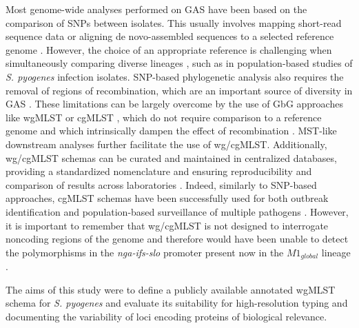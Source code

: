 Most genome-wide analyses performed on \ac{GAS} have been based on the comparison of \ac{SNPs} between isolates. This usually involves mapping short-read sequence data or aligning de novo-assembled sequences to a selected reference genome \cite{turner_emergence_2015, zhu_molecular_2015, zhu_trading_2015, lynskey_emergence_2019, nasser_evolutionary_2014, beres_molecular_2010, turner_community_2017, coelho_genomic_2019, davies_atlas_2019}. However, the choice of an appropriate reference is challenging when simultaneously comparing diverse lineages \cite{maiden_mlst_2013, neumann_core_2019}, such as in population-based studies of \textit{S. pyogenes} infection isolates. \ac{SNP}-based phylogenetic analysis also requires the removal of regions of recombination, which are an important source of diversity in \ac{GAS} \cite{davies_atlas_2019, maiden_mlst_2013, neumann_core_2019, mcgregor_multilocus_2004}. These limitations can be largely overcome by the use of \ac{GbG} approaches like \ac{wgMLST} or \ac{cgMLST} \cite{carrico_primer_2018}, which do not require comparison to a reference genome and which intrinsically dampen the effect of recombination \cite{maiden_mlst_2013, neumann_core_2019, leopold_bacterial_2014}. \ac{MST}-like downstream analyses further facilitate the use of \ac{wg/cgMLST}. Additionally, \ac{wg/cgMLST} schemas can be curated and maintained in centralized databases, providing a standardized nomenclature and ensuring reproducibility and comparison of results across laboratories \cite{maiden_mlst_2013, carrico_primer_2018, higgins_development_2017, bletz_defining_2018}. Indeed, similarly to \ac{SNP}-based approaches, \ac{cgMLST} schemas have been successfully used for both outbreak identiﬁcation and population-based surveillance of multiple pathogens \cite{neumann_core_2019, leopold_bacterial_2014, higgins_development_2017, bletz_defining_2018, abdel-glil_whole-genome-based_2021, pinto_insights_2019, bardenstein_brucellosis_2021}. However, it is important to remember that \ac{wg/cgMLST} is not designed to interrogate noncoding regions of the genome and therefore would have been unable to detect the polymorphisms in the \textit{nga-ifs-slo} promoter present now in the $M1_{global}$ lineage \cite{lynskey_emergence_2019}.

The aims of this study were to deﬁne a publicly available annotated \ac{wgMLST} schema for \textit{S. pyogenes} and evaluate its suitability for high-resolution typing and documenting the variability of loci encoding proteins of biological relevance.

